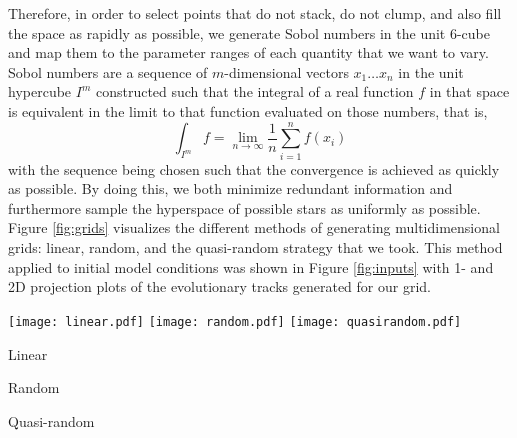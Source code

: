 \documentclass[manuscript,linenumbers]{aastex6}
\begin{document}
Therefore, in order to select points that do not stack, do not clump, and also fill the space as rapidly as possible, we generate Sobol numbers \citep{sobol1967distribution} in the unit 6-cube and map them to the parameter ranges of each quantity that we want to vary. Sobol numbers are a sequence of $m$-dimensional vectors $x_1 \ldots x_n$ in the unit hypercube $I^m$ constructed such that the integral of a real function $f$ in that space is equivalent in the limit to that function evaluated on those numbers, that is,
\begin{equation}
    \int_{I^m} f = \lim_{n \to \infty} \frac{1}{n}\sum_{i=1}^n f(x_i)
\end{equation}
with the sequence being chosen such that the convergence is achieved as quickly as possible. By doing this, we both minimize redundant information and furthermore sample the hyperspace of possible stars as uniformly as possible. Figure \ref{fig:grids} visualizes the different methods of generating multidimensional grids: linear, random, and the quasi-random strategy that we took. This method applied to initial model conditions was shown in Figure \ref{fig:inputs} with 1- and 2D projection plots of the evolutionary tracks generated for our grid. 

\begin{figure*}
    \centering
    \texttt{[image: linear.pdf]}\hfill
    \texttt{[image: random.pdf]}\hfill
    \texttt{[image: quasirandom.pdf]}\\
    \parbox{0.32\textwidth}{\centering Linear}\hfill
    \parbox{0.32\textwidth}{\centering Random}\hfill
    \parbox{0.32\textwidth}{\centering Quasi-random}
    \caption{Results of different methods for generating multidimensional grids portrayed via a unit cube projected onto a unit square. Linear (left), random (middle), and quasi-random (right) grids are generated in three dimensions, with color depicting the third dimension, i.e., the distance between the reader and the screen. From top to bottom, all three methods are shown with 100, 400, and 2000 points generated, respectively. }%
    \label{fig:grids}
\end{figure*}


\end{document}
